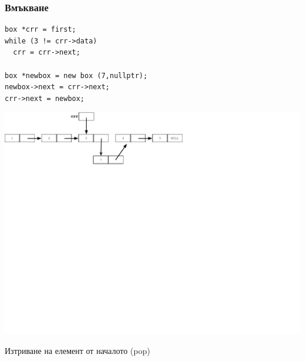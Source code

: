 \documentclass{beamer}
\begin{document}
\begin{frame}[fragile]
\frametitle{Вмъкване}

\begin{flushleft}
\begin{lstlisting}
box *crr = first;
while (3 != crr->data)
  crr = crr->next;

box *newbox = new box (7,nullptr);
newbox->next = crr->next;
crr->next = newbox;
\end{lstlisting}  
\end{flushleft}


\includegraphics[width=14.0cm]{images/05_ll_insert_secondlink}

\end{frame}



\begin{frame}
\centerline{Изтриване на елемент от началото (pop)}
\end{frame}
\end{document}
